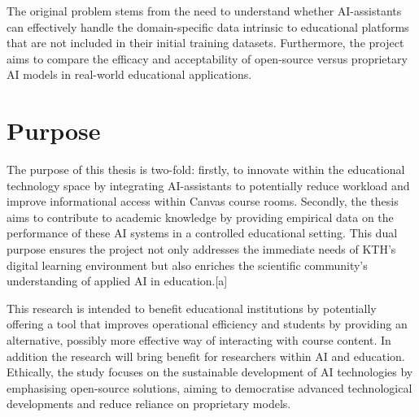 The original problem stems from the need to understand whether AI-assistants can effectively handle the domain-specific data intrinsic to educational platforms that are not included in their initial training datasets. Furthermore, the project aims to compare the efficacy and acceptability of open-source versus proprietary AI models in real-world educational applications.


\section{Purpose}




The purpose of this thesis is two-fold: firstly, to innovate within the educational technology space by integrating AI-assistants to potentially reduce workload and improve informational access within Canvas course rooms. Secondly, the thesis aims to contribute to academic knowledge by providing empirical data on the performance of these AI systems in a controlled educational setting. This dual purpose ensures the project not only addresses the immediate needs of KTH's digital learning environment but also enriches the scientific community’s understanding of applied AI in education.[a]


This research is intended to benefit educational institutions by potentially offering a tool that improves operational efficiency and students by providing an alternative, possibly more effective way of interacting with course content. In addition the research will bring benefit for researchers within AI and education. Ethically, the study focuses on the sustainable development of AI technologies by emphasising open-source solutions, aiming to democratise advanced technological developments and reduce reliance on proprietary models.




